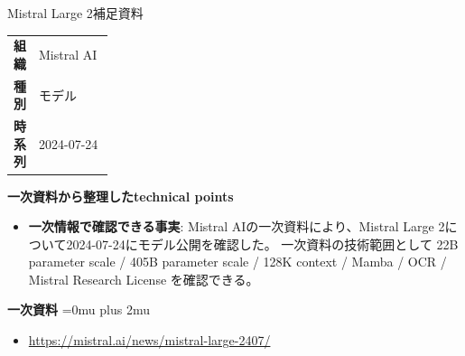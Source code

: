 \begin{technicalnote}{Mistral Large 2}{補足資料}
\begingroup
\begin{tabularx}{\linewidth}{@{}>{\bfseries}p{0.22\linewidth}X@{}}
組織 & Mistral AI \\
種別 & モデル \\
時系列 & 2024-07-24 \\
\end{tabularx}
\smallskip
{\bfseries 一次資料から整理したtechnical points}
\begin{itemize}[leftmargin=1.5em,itemsep=0.35em]
\item \textbf{一次情報で確認できる事実}: Mistral AIの一次資料により、Mistral Large 2について2024-07-24にモデル公開を確認した。 一次資料の技術範囲として 22B parameter scale / 405B parameter scale / 128K context / Mamba / OCR / Mistral Research License を確認できる。
\end{itemize}
\begin{minipage}{\linewidth}
\begin{samepage}
{\bfseries 一次資料}
\begingroup\sloppy
\Urlmuskip=0mu plus 2mu\relax
\begin{itemize}[leftmargin=1.5em,itemsep=0.25em]
\item {\scriptsize\url{https://mistral.ai/news/mistral-large-2407/}}
\end{itemize}
\endgroup
\end{samepage}
\end{minipage}
\endgroup
\end{technicalnote}
\medskip

